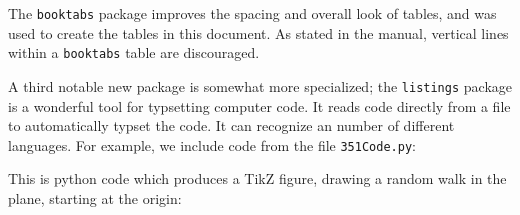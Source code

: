 \documentclass{paper}
\begin{document}
The \verb~booktabs~ package improves the spacing and overall look of tables, and was used
to create the tables in this document.  As stated in the manual, vertical lines within
a \verb~booktabs~ table are discouraged.

A third notable new package is somewhat more specialized; the \verb~listings~ package is a
wonderful tool for typsetting computer code.  It reads code directly from a file to 
automatically typset the code.  It can recognize an number of different languages.  For example,
we include code from the file \verb~351Code.py~:
\begin{center}

\end{center}

This is python code which produces a TikZ figure, drawing a random walk in the plane, starting
at the origin: 
\begin{center}
 
\end{center}
\end{document}
